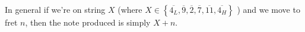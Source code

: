\documentclass[preview]{standalone}
\begin{document}
\begin{center}
In general  if we're on string $X$ (where $X \in \left\{\overline{4_L}, \overline{9}, \overline{2}, \overline{7}, \overline{11}, \overline{4_H}  \right\}$ ) and we move to fret $n$, then the note produced is simply $X + n$.
\end{center}
\end{document}
